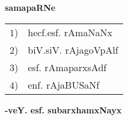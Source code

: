 \begin{center}
  \Large{\bf samapaRNe}
\end{center}

\medskip
\begin{center}
\begin{tabular}{ll}
  $1$) & hecf.esf. rAmaNaNx\\[0.2cm]
  $2$) & biV.siV. rAjagoVpAlf\\[0.2cm]
  $3$) & esf. rAmaparxsAdf\\[0.2cm]
  $4$) & enf. rAjaBUSaNf
\end{tabular}
\end{center}

\hfill{\bf -veY. esf. subarxhamxNayx}
